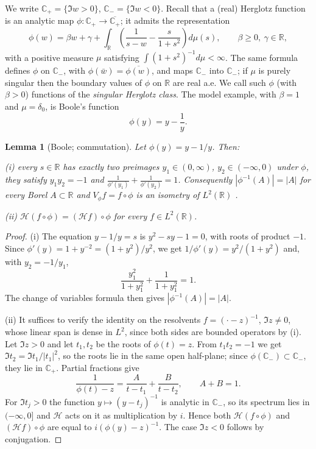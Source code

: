 \documentclass{article}
\newtheorem{lemma}{Lemma}
\def\HH{{\mathcal H}}
\def\R{{\mathbb R}}
\def\C{{\mathbb C}}
\begin{document}
	We write $\C_+=\{\Im w>0\}$, $\C_-=\{\Im w<0\}$. Recall that a (real) Herglotz function is an analytic map $\phi:\C_+\to\overline{\C_+}$; it admits the representation
	\begin{equation}\label{herglotz}
		\phi(w)=\beta w+\gamma+\int_\R\left(\frac 1{s-w}-\frac s{1+s^2}\right)d\mu(s),
		\qquad \beta\geq 0,\ \gamma\in\R,
	\end{equation}
	with a positive measure $\mu$ satisfying $\int (1+s^2)^{-1}d\mu<\infty$. The same formula defines $\phi$ on $\C_-$, with $\phi(\bar w)=\overline{\phi(w)}$, and maps $\C_-$ into $\C_-$; if $\mu$ is purely singular then the boundary values of $\phi$ on $\R$ are real a.e. We call such $\phi$ (with $\beta>0$) functions of the \emph{singular Herglotz class}. The model example, with $\beta=1$ and $\mu=\delta_0$, is Boole's function
	$$\phi(y)=y-\frac 1y.$$

	\begin{lemma}[Boole; commutation]\label{Lboole}
		Let $\phi(y)=y-1/y$. Then:

		(i) every $s\in\R$ has exactly two preimages $y_1\in(0,\infty)$, $y_2\in(-\infty,0)$ under $\phi$, they satisfy $y_1y_2=-1$ and
		$\frac 1{\phi'(y_1)}+\frac 1{\phi'(y_2)}=1$. Consequently $|\phi^{-1}(A)|=|A|$ for every Borel $A\subset\R$ and $V_\phi f=f\circ\phi$ is an isometry of $L^2(\R)$ \cite{Bo}.

		(ii) $\HH(f\circ\phi)=(\HH f)\circ\phi$ for every $f\in L^2(\R)$.
	\end{lemma}

	\begin{proof}
		(i) The equation $y-1/y=s$ is $y^2-sy-1=0$, with roots of product $-1$. Since $\phi'(y)=1+y^{-2}=(1+y^2)/y^2$, we get $1/\phi'(y)=y^2/(1+y^2)$ and, with $y_2=-1/y_1$,
		$$\frac{y_1^2}{1+y_1^2}+\frac{1}{1+y_1^2}=1.$$
		The change of variables formula then gives $|\phi^{-1}(A)|=|A|$.

		(ii) It suffices to verify the identity on the resolvents $f=(\cdot-z)^{-1}$, $\Im z\neq 0$, whose linear span is dense in $L^2$, since both sides are bounded operators by (i). Let $\Im z>0$ and let $t_1,t_2$ be the roots of $\phi(t)=z$. From $t_1t_2=-1$ we get $\Im t_2=\Im t_1/|t_1|^2$, so the roots lie in the same open half-plane; since $\phi(\C_-)\subset\C_-$, they lie in $\C_+$. Partial fractions give
		$$\frac 1{\phi(t)-z}=\frac{A}{t-t_1}+\frac{B}{t-t_2},\qquad A+B=1.$$
		For $\Im t_j>0$ the function $y\mapsto (y-t_j)^{-1}$ is analytic in $\C_-$, so its spectrum lies in $(-\infty,0]$ and $\HH$ acts on it as multiplication by $i$. Hence both $\HH(f\circ\phi)$ and $(\HH f)\circ\phi$ are equal to $i(\phi(y)-z)^{-1}$. The case $\Im z<0$ follows by conjugation.
	\end{proof}
\end{document}
